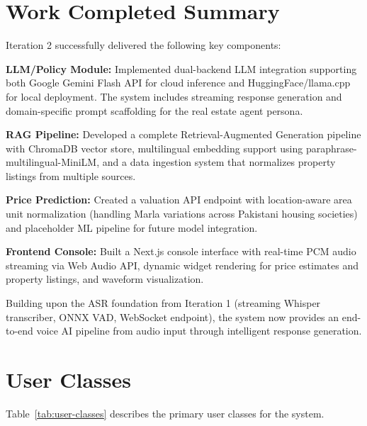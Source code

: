 \section{Work Completed Summary}

Iteration 2 successfully delivered the following key components:

\textbf{LLM/Policy Module:} Implemented dual-backend LLM integration supporting both Google Gemini Flash API for cloud inference and HuggingFace/llama.cpp for local deployment. The system includes streaming response generation and domain-specific prompt scaffolding for the real estate agent persona.

\textbf{RAG Pipeline:} Developed a complete Retrieval-Augmented Generation pipeline with ChromaDB vector store, multilingual embedding support using paraphrase-multilingual-MiniLM, and a data ingestion system that normalizes property listings from multiple sources.

\textbf{Price Prediction:} Created a valuation API endpoint with location-aware area unit normalization (handling Marla variations across Pakistani housing societies) and placeholder ML pipeline for future model integration.

\textbf{Frontend Console:} Built a Next.js console interface with real-time PCM audio streaming via Web Audio API, dynamic widget rendering for price estimates and property listings, and waveform visualization.

Building upon the ASR foundation from Iteration 1 (streaming Whisper transcriber, ONNX VAD, WebSocket endpoint), the system now provides an end-to-end voice AI pipeline from audio input through intelligent response generation.

\section{User Classes}

Table~\ref{tab:user-classes} describes the primary user classes for the system.

